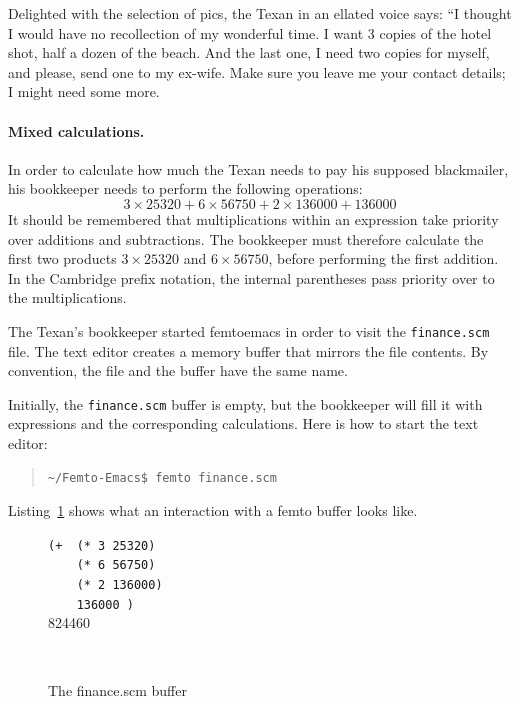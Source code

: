 \documentclass[a4paper,12pt]{book}
\newenvironment{fmpage}[1]
           {\begin{lrbox}{\fmbox}\begin{minipage}{#1}}
           {\end{minipage}\end{lrbox}\fbox{\usebox{\fmbox}}}
\begin{document}
Delighted with the selection of pics,
the Texan in an ellated voice says:
“I thought I would have no recollection
of my wonderful time. I want 3 copies
of the hotel shot, half a dozen of the beach.
And the last one, I need two copies for myself,
and please, send one to my ex-wife.
Make sure you leave me your contact
details; I might need some more.

\paragraph{Mixed calculations.}
In order to calculate how much the
Texan needs to pay his supposed blackmailer,
his bookkeeper needs to perform the
following operations:
$$3\times 25320+6\times 56750 + 2\times 136000+136000$$
It should be remembered that multiplications
within an expression take priority over additions
and subtractions. The bookkeeper must therefore
calculate the first two products $3\times 25320$
and $6\times 56750$, before performing the first
addition. In the Cambridge prefix notation,
the internal parentheses pass priority over
to the multiplications.

The Texan's bookkeeper started femtoemacs
in order to visit the \verb|finance.scm|
file. The text editor creates a memory
buffer that mirrors the file contents.
By convention, the file and the buffer
have the same name.

Initially, the \verb|finance.scm| buffer
is empty, but the bookkeeper will fill it
with expressions and the corresponding
calculations. Here is how to start the
text editor:
\begin{quote}
\begin{verbatim}
~/Femto-Emacs$ femto finance.scm
\end{verbatim}
\end{quote}
Listing~\ref{texan:photos} shows what
an interaction with a femto buffer looks like.

\begin{figure}[!h]
\begin{fmpage}{0.8\textwidth}

\verb|(+  (* 3 25320)|\\
\verb|    (* 6 56750)|\\
\verb|    (* 2 136000)|\\
\verb|    136000 )|\keys{~]~}\\ 
824460
\end{fmpage}

\begin{fmpage}{0.8\textwidth}
\verb| |
\end{fmpage}
\caption{The finance.scm buffer}
\label{texan:photos}
\end{figure}
\end{document}
